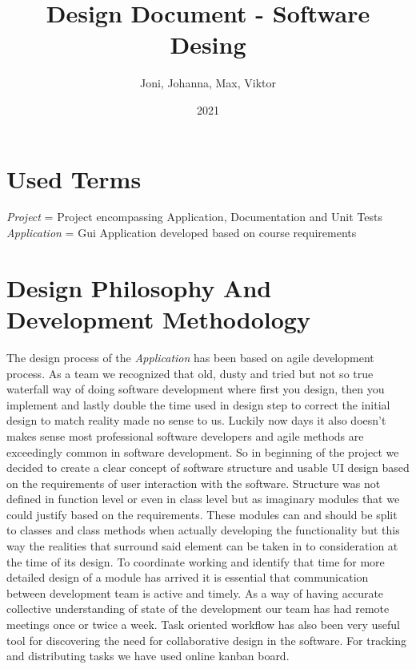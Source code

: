\documentclass{article}
\title{Design Document - Software Desing}
\author{Joni, Johanna, Max, Viktor}
\date{2021}
\begin{document}
\maketitle

\tableofcontents

\newpage

\section{Used Terms}

\emph{Project} = Project encompassing Application, Documentation and Unit Tests
\emph{Application} = Gui Application developed based on course requirements


\section{Design Philosophy And Development Methodology} %

The design process of the \emph{Application} has been based on agile development process. As a team we recognized that old, dusty and tried but not so true waterfall way of doing software development where first you design,  then you implement and lastly double the time used in design step to correct the initial design to match reality made no sense to us. Luckily now days it also doesn't makes sense most professional software developers and agile methods are exceedingly common in software development. So in beginning of the project we decided to create a clear concept of software structure and usable UI design based on the requirements of user interaction with the software. Structure was not defined in function level or even in class level but as imaginary modules that we could justify based on the requirements. These modules can and should be split to classes and class methods when actually developing the functionality but this way the realities that surround said element can be taken in to consideration at the time of its design. To coordinate working and identify that time for more detailed design of a module has arrived it is essential that communication between development team is active and timely. As a way of having accurate collective understanding of state of the development our team has had remote meetings once or twice a week. Task oriented workflow has also been very useful tool for discovering the need for collaborative design in the software. For tracking and distributing tasks we have used online kanban board. 
\end{document}
